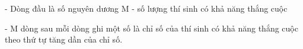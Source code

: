 - Dòng đầu là số nguyên dương M - số lượng thí sinh có khả năng thắng cuộc   


   - M dòng sau mỗi dòng ghi một số là chỉ số của thí sinh có khả năng thắng cuộc theo thứ tự tăng dần của chỉ số.